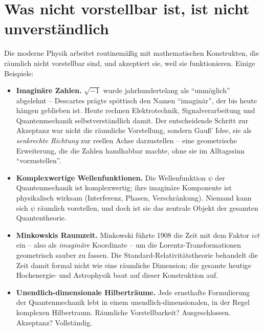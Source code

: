 \section{Was nicht vorstellbar ist, ist nicht unverständlich}

Die moderne Physik arbeitet routinemäßig mit mathematischen Konstrukten,
die räumlich nicht vorstellbar sind, und akzeptiert sie, weil sie
funktionieren. Einige Beispiele:

\begin{itemize}[leftmargin=2em,itemsep=4pt,topsep=4pt]
  \item \textbf{Imaginäre Zahlen.} $\sqrt{-1}$ wurde jahrhundertelang
        als \enquote{unmöglich} abgelehnt -- Descartes prägte spöttisch
        den Namen \enquote{imaginär}, der bis heute hängen geblieben
        ist. Heute rechnen Elektrotechnik, Signalverarbeitung und
        Quantenmechanik selbstverständlich damit. Der entscheidende
        Schritt zur Akzeptanz war nicht die räumliche Vorstellung,
        sondern Gauß' Idee, sie als \emph{senkrechte Richtung} zur
        reellen Achse darzustellen -- eine geometrische Erweiterung,
        die die Zahlen handhabbar machte, ohne sie im Alltagssinn
        \enquote{vorzustellen}.

  \item \textbf{Komplexwertige Wellenfunktionen.} Die Wellenfunktion
        $\psi$ der Quantenmechanik ist komplexwertig; ihre imaginäre
        Komponente ist physikalisch wirksam (Interferenz, Phasen,
        Verschränkung). Niemand kann sich $\psi$ räumlich vorstellen,
        und doch ist sie das zentrale Objekt der gesamten
        Quantentheorie.

  \item \textbf{Minkowskis Raumzeit.} Minkowski führte 1908 die Zeit
        mit dem Faktor $ict$ ein -- also als \emph{imaginäre}
        Koordinate -- um die Lorentz-Transformationen geometrisch
        sauber zu fassen. Die Standard-Relativitätstheorie behandelt
        die Zeit damit formal nicht wie eine räumliche Dimension; die
        gesamte heutige Hochenergie- und Astrophysik baut auf dieser
        Konstruktion auf.

  \item \textbf{Unendlich-dimensionale Hilberträume.} Jede
        ernsthafte Formulierung der Quantenmechanik lebt in einem
        unendlich-dimensionalen, in der Regel komplexen Hilbertraum.
        Räumliche Vorstellbarkeit? Ausgeschlossen. Akzeptanz?
        Vollständig.


\end{itemize}
